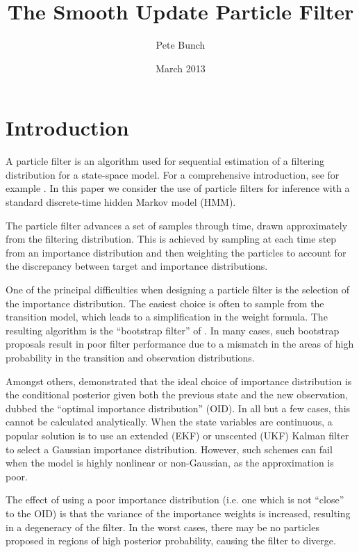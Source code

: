 \documentclass[a4paper,10pt]{article}
\title{The Smooth Update Particle Filter}
\author{Pete Bunch}
\date{March 2013}
\begin{document}
\maketitle

\begin{abstract}
\end{abstract}

\section{Introduction}

A particle filter is an algorithm used for sequential estimation of a filtering distribution for a state-space model. For a comprehensive introduction, see for example \cite{Cappe2007,Doucet2009}. In this paper we consider the use of particle filters for inference with a standard discrete-time hidden Markov model (HMM).

The particle filter advances a set of samples through time, drawn approximately from the filtering distribution. This is achieved by sampling at each time step from an importance distribution and then weighting the particles to account for the discrepancy between target and importance distributions.

One of the principal difficulties when designing a particle filter is the selection of the importance distribution. The easiest choice is often to sample from the transition model, which leads to a simplification in the weight formula. The resulting algorithm is the ``bootstrap filter'' of \cite{Gordon1993}. In many cases, such bootstrap proposals result in poor filter performance due to a mismatch in the areas of high probability in the transition and observation distributions.

Amongst others, \cite{Doucet2000a} demonstrated that the ideal choice of importance distribution is the conditional posterior given both the previous state and the new observation, dubbed the ``optimal importance distribution'' (OID). In all but a few cases, this cannot be calculated analytically. When the state variables are continuous, a popular solution is to use an extended (EKF) or unscented (UKF) Kalman filter to select a Gaussian importance distribution. However, such schemes can fail when the model is highly nonlinear or non-Gaussian, as the approximation is poor.

The effect of using a poor importance distribution (i.e. one which is not ``close'' to the OID) is that the variance of the importance weights is increased, resulting in a degeneracy of the filter. In the worst cases, there may be no particles proposed in regions of high posterior probability, causing the filter to diverge.
\end{document}
